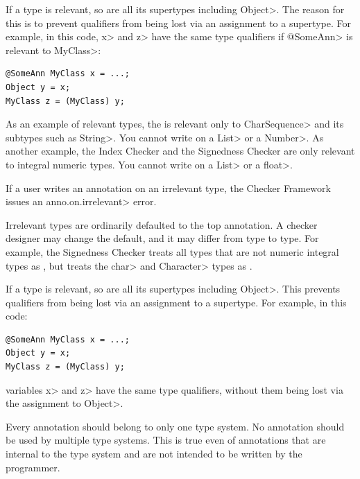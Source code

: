 If a type is relevant, so are all its supertypes including \<Object>.
The reason for this is to prevent qualifiers from being lost via an
assignment to a supertype.  For example, in this code, \<x> and \<z> have
the same type qualifiers if \<@SomeAnn> is relevant to \<MyClass>:

\begin{Verbatim}
@SomeAnn MyClass x = ...;
Object y = x;
MyClass z = (MyClass) y;
\end{Verbatim}

As an example of relevant types, the  is relevant only to \<CharSequence> and its subtypes such
as \<String>.  You cannot write 
on a \<List> or a \<Number>.
%
As another example, the Index Checker and the Signedness Checker are only
relevant to integral numeric types.  You cannot write
 on a \<List> or a \<float>.

If a user writes an annotation on an irrelevant type, the Checker Framework
issues an \<anno.on.irrelevant> error.

Irrelevant types are ordinarily defaulted to the top annotation.
A checker designer may change the default, and it may differ from type to type.  For
example, the Signedness Checker treats all types that are not numeric
integral types as , but
treats the \<char> and \<Character> types as
.



If a type is relevant, so are all its supertypes including \<Object>.
This prevents qualifiers from being lost via an assignment to a supertype.
For example, in this code:

\begin{Verbatim}
@SomeAnn MyClass x = ...;
Object y = x;
MyClass z = (MyClass) y;
\end{Verbatim}

\noindent
variables \<x> and \<z> have the same type qualifiers, without them being
lost via the assignment to \<Object>.



Every annotation should belong to only one type system.  No annotation
should be used by multiple type systems.  This is true even of annotations
that are internal to the type system and are not intended to be written by
the programmer.

